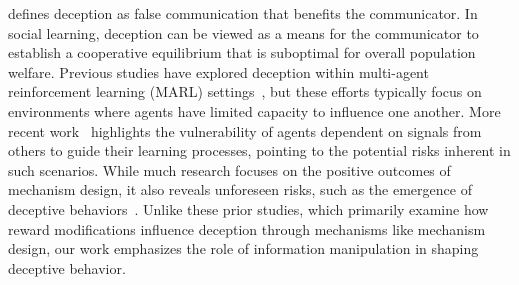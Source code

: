 \citet{bond1988evolution} defines deception as false communication that benefits the communicator. 
In social learning, deception can be viewed as a means for the communicator to establish a cooperative equilibrium that is suboptimal for overall population welfare. 
Previous studies have explored deception within multi-agent reinforcement learning (MARL) settings~\citep{asgharnia2020deception, bontrager2019superstition, li2020effective, ghiya2020learning}, but these efforts typically focus on environments where agents have limited capacity to influence one another. 
More recent work~\citep{chelarescu2021deception} highlights the vulnerability of agents dependent on signals from others to guide their learning processes, pointing to the potential risks inherent in such scenarios. 
While much research focuses on the positive outcomes of mechanism design, it also reveals unforeseen risks, such as the emergence of deceptive behaviors~\citep{hughes2018inequity, jaques2019social, yang2020learning, lupu2020gifting, ndousse2021emergent}. 
Unlike these prior studies, which primarily examine how reward modifications influence deception through mechanisms like mechanism design, our work emphasizes the role of information manipulation in shaping deceptive behavior.


